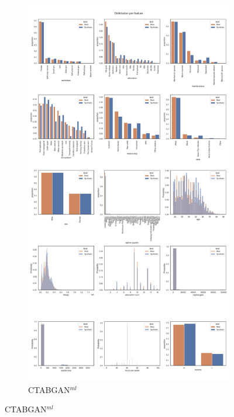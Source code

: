 \begin{landscape}
	\begin{figure}[h]
		\centering
		\hfill
		\begin{subfigure}{0.3\linewidth}
			\includegraphics[height=\textheight,width=\linewidth,keepaspectratio]{images/distributions_full/ctabgan.jpg}
			\caption{CTABGAN$^{ml}$}
		\end{subfigure}

\end{figure}
\end{landscape}

